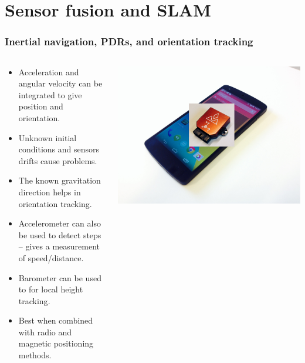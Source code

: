 \documentclass[xcolor=svgnames,english,handout]{beamer}
\begin{document}
\section{Sensor fusion and SLAM}

\begin{frame}
  \frametitle{Inertial navigation, PDRs, and orientation tracking}

  \begin{columns}
  \begin{column}{0.6\textwidth}
  \begin{itemize}[<+->]       
  \item \alert{Acceleration and angular velocity} can be \alert{integrated} to give position and orientation.
  \item Unknown \alert{initial conditions and sensors drifts} cause problems.
  \item The \alert{known gravitation direction} helps in \alert{orientation tracking}.
  \item Accelerometer can also be used to \alert{detect steps} -- gives a measurement of \alert{speed/distance}.
  \item \alert{Barometer} can be used to for \alert{local height tracking}. 
  \item Best when \alert{combined} with \alert{radio and magnetic} positioning methods.
  \end{itemize}
  \end{column}
  \begin{column}{0.4\textwidth}
  \includegraphics[width=\columnwidth]{mobile2} \\

\end{column}
\end{columns}
\end{frame}
\end{document}
